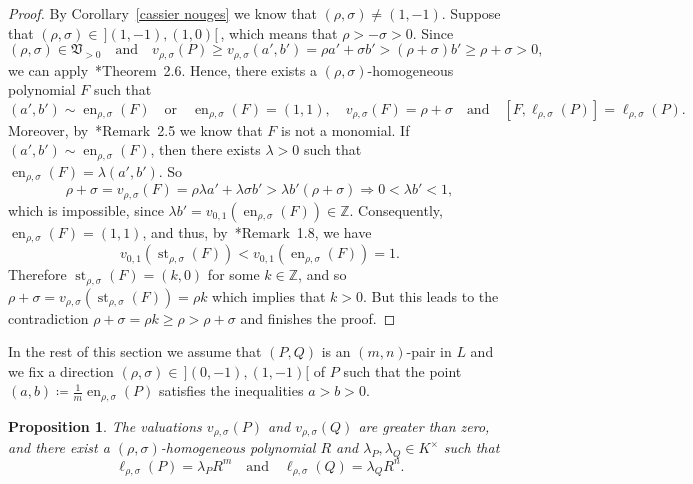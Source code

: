 \documentclass[reqno,a4paper]{amsart}
\newtheorem{proposition}[theorem]{Proposition}
\theoremstyle{definition}
\theoremstyle{remark}
\DeclareMathOperator{\en}{en}
\DeclareMathOperator{\st}{st}
\begin{document}
\begin{proof} By Corollary~\ref{cassier nouges} we know that $(\rho,\sigma)\ne (1,-1)$. Suppose that $(\rho,\sigma) \in \hspace{2pt}](1,-1),(1,0)[ \hspace{2pt}$, which means that $\rho>-\sigma>0$. Since
$$
(\rho,\sigma)\in \mathfrak{V}_{>0} \quad\text{and}\quad v_{\rho,\sigma}(P)\ge v_{\rho,\sigma}(a',b') = \rho a'+\sigma b'>(\rho +\sigma) b'\ge \rho +\sigma >0,
$$
we can apply~\cite{GGV}*{Theorem~2.6}. Hence, there exists a $(\rho,\sigma)$-homogeneous polynomial $F$ such that
$$
(a',b') \sim \en_{\rho,\sigma}(F)\quad\text{or}\quad \en_{\rho,\sigma}(F) = (1,1),\quad v_{\rho,\sigma}(F) = \rho + \sigma\quad\text{and}\quad [F,\ell_{\rho,\sigma}(P)]= \ell_{\rho,\sigma}(P).
$$
Moreover, by~\cite{GGV}*{Remark~2.5} we know that $F$ is not a monomial. If $(a',b')\sim \en_{\rho,\sigma}(F)$, then there exists $\lambda>0$ such that $\en_{\rho,\sigma}(F) =\lambda (a',b')$. So
$$
\rho + \sigma = v_{\rho,\sigma}(F) = \rho \lambda a' + \lambda\sigma b' > \lambda b'(\rho+\sigma) \Longrightarrow 0<\lambda b' < 1,
$$
which is impossible, since $\lambda b' = v_{0,1}(\en_{\rho,\sigma}(F))\in \mathds{Z}$. Consequently, $\en_{\rho,\sigma}(F) = (1,1)$, and thus, by~\cite{GGV}*{Remark~1.8}, we have
$$
v_{0,1}(\st_{\rho,\sigma}(F)) < v_{0,1}(\en_{\rho,\sigma}(F)) = 1.
$$
Therefore $\st_{\rho,\sigma}(F) = (k,0)$ for some $k\in \mathds{Z}$, and so $\rho + \sigma = v_{\rho,\sigma}(\st_{\rho,\sigma}(F)) = \rho k$ which implies that $k>0$. But this leads to the contradiction  $\rho + \sigma = \rho k \ge \rho > \rho + \sigma$ and finishes the proof.
\end{proof}

In the rest of this section we assume that $(P,Q)$ is an $(m,n)$-pair in $L$ and we fix a direction $(\rho,\sigma)\in\hspace{2pt} ](0,-1),(1,-1)[$ of $P$ such that the point $(a,b)\coloneqq \frac 1m\en_{\rho,\sigma}(P)$ satisfies the in\-equal\-ities $a>b>0$.

\begin{proposition}\label{existe R} The valuations $v_{\rho,\sigma}(P)$ and $v_{\rho,\sigma}(Q)$ are greater than zero, and there exist a $(\rho,\sigma)$-homogeneous po\-ly\-nomial $R$ and $\lambda_P,\lambda_Q\in K^{\times}$ such that
\begin{equation}
\ell_{\rho,\sigma}(P) = \lambda_P R^m\quad\text{and}\quad \ell_{\rho,\sigma}(Q) = \lambda_Q R^n.\label{potencias de R}
\end{equation}
\end{proposition}
\end{document}
